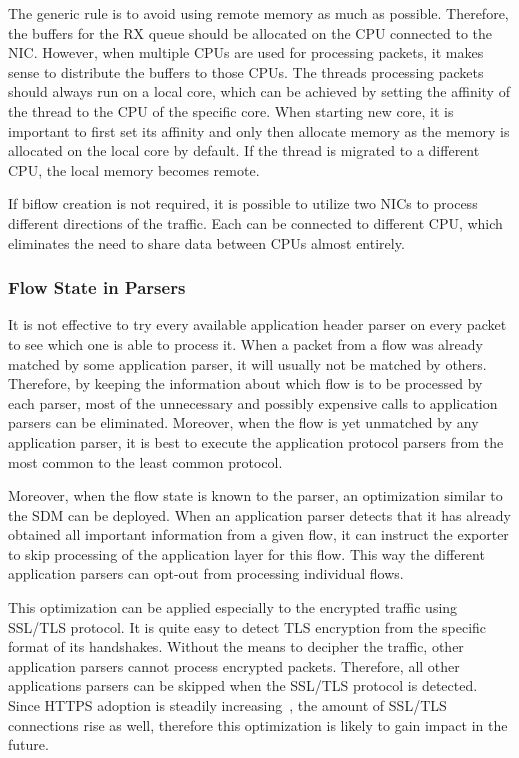 The generic rule is to avoid using remote memory as much as possible. Therefore, the buffers for the RX queue should be allocated on the CPU connected to the NIC. However, when multiple CPUs are used for processing packets, it makes sense to distribute the buffers to those CPUs. The threads processing packets should always run on a local core, which can be achieved by setting the affinity of the thread to the CPU of the specific core. When starting new core, it is important to first set its affinity and only then allocate memory as the memory is allocated on the local core by default. If the thread is migrated to a different CPU, the local memory becomes remote.

If biflow creation is not required, it is possible to utilize two NICs to process different directions of the traffic. Each can be connected to different CPU, which eliminates the need to share data between CPUs almost entirely.

\subsubsection{Flow State in Parsers}

It is not effective to try every available application header parser on every packet to see which one is able to process it. When a packet from a flow was already matched by some application parser, it will usually not be matched by others. Therefore, by keeping the information about which flow is to be processed by each parser, most of the unnecessary and possibly expensive calls to application parsers can be eliminated. Moreover, when the flow is yet unmatched by any application parser, it is best to execute the application protocol parsers from the most common to the least common protocol.

Moreover, when the flow state is known to the parser, an optimization similar to the SDM can be deployed. When an application parser detects that it has already obtained all important information from a given flow, it can instruct the exporter to skip processing of the application layer for this flow. This way the different application parsers can opt-out from processing individual flows.

This optimization can be applied especially to the encrypted traffic using SSL/TLS protocol. It is quite easy to detect TLS encryption from the specific format of its handshakes. Without the means to decipher the traffic, other application parsers cannot process encrypted packets. Therefore, all other applications parsers can be skipped when the SSL/TLS protocol is detected. Since HTTPS adoption is steadily increasing~\cite{Felt-2017-Measuring}, the amount of SSL/TLS connections rise as well, therefore this optimization is likely to gain impact in the future.

